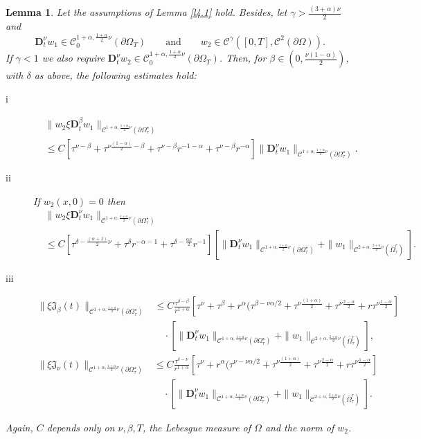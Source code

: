 \documentclass[10pt,a4paper]{amsart}
\newtheorem{lemma}{Lemma}
\def\C {\mathcal{C}}
\begin{document}
\begin{lemma}\label{l4.1bis}
Let the assumptions of Lemma \ref{l4.1} hold. Besides,
let $\gamma>\frac{(3+\alpha)\nu}{2}$ and
\[
\mathbf{D}_{t}^{\nu}w_1\in\C_{0}^{1+\alpha,\frac{1+\alpha}{2}\nu}(\partial\Omega_{T}) \qquad
\text{and}\qquad w_{2}\in\C^{\gamma}([0,T],\C^{2}(\partial\Omega)).
\]
If $\gamma<1$ we
 also require $\mathbf{D}_{t}^{\nu}w_2\in\C_{0}^{1+\alpha,\frac{1+\alpha}{2}\nu}(\partial\Omega_{T})$.
 Then, for $\beta\in(0,\frac{\nu(1-\alpha)}{2})$, with $\delta$ as above,
 the following estimates hold:
 \begin{description}
	\item[i]
	\begin{align*}
	&\|w_2\xi \mathbf{D}_{t}^{\beta}w_1\|_{\C^{1+\alpha,\frac{1+\alpha}{2}\nu}(\partial\Omega^{\star}_{\tau})}\\&\leq C
		[\tau^{\nu-\beta}+\tau^{\nu\frac{(1-\alpha)}{2}-\beta}+\tau^{\nu-\beta}r^{-1-\alpha}+\tau^{\nu-\beta}r^{-\alpha}]\|\mathbf{D}_{t}^{\nu}w_1\|_{\C^{1+\alpha,\frac{1+\alpha}{2}\nu}(\partial\Omega^{\star}_{\tau})}.
	\end{align*}
		\item[ii] If $w_2(x,0)=0$ then
		\begin{align*}
		&\|w_2\xi \mathbf{D}_{t}^{\nu}w_1\|_{\C^{1+\alpha,\frac{1+\alpha}{2}\nu}(\partial\Omega^{\star}_{\tau})}\\&
		\leq C
		[\tau^{\delta-\frac{(\alpha+1)}{2}\nu}+\tau^{\delta}r^{-\alpha-1}+\tau^{\delta-\frac{\alpha\nu}{2}}r^{-1}][\|\mathbf{D}_{t}^{\nu}w_1\|_{\C^{1+\alpha,\frac{1+\alpha}{2}\nu}(\partial\Omega^{\star}_{\tau})}+\|w_1\|_{\C^{2+\alpha,\frac{2+\alpha}{2}\nu}(\bar{\Omega}^{r}_{\tau})}].
		\end{align*}
		\item[iii]
		\begin{align*}
		\|\xi\mathfrak{J}_{\beta}(t)\|_{\C^{1+\alpha,\frac{1+\alpha}{2}\nu}(\partial\Omega^{\star}_{\tau})}&\leq C
		\frac{\tau^{\delta-\beta}}{r^{1+\alpha}}[\tau^{\nu}+\tau^{\beta}+r^{\alpha}(\tau^{\beta-\nu\alpha/2}+\tau^{\nu\frac{(1+\alpha)}{2}}+\tau^{\nu\frac{2-\alpha}{2}}+r\tau^{\nu\frac{1-\alpha}{2}}]\\
		&
		\quad\cdot
		[\|\mathbf{D}_{t}^{\nu}w_1\|_{\C^{1+\alpha,\frac{1+\alpha}{2}\nu}(\partial\Omega^{\star}_{\tau})}+\|w_1\|_{\C^{2+\alpha,\frac{2+\alpha}{2}\nu}(\bar{\Omega}^{r}_{\tau})}],
		\end{align*}
				\begin{align*}
		\|\xi\mathfrak{J}_{\nu}(t)\|_{\C^{1+\alpha,\frac{1+\alpha}{2}\nu}(\partial\Omega^{\star}_{\tau})}&\leq C
		\frac{\tau^{\delta-\nu}}{r^{1+\alpha}}[\tau^{\nu}+r^{\alpha}(\tau^{\nu-\nu\alpha/2}+\tau^{\nu\frac{(1+\alpha)}{2}}+\tau^{\nu\frac{2-\alpha}{2}}+r\tau^{\nu\frac{1-\alpha}{2}}]\\
		&
		\quad\cdot
		[\|\mathbf{D}_{t}^{\nu}w_1\|_{\C^{1+\alpha,\frac{1+\alpha}{2}\nu}(\partial\Omega^{\star}_{\tau})}+\|w_1\|_{\C^{2+\alpha,\frac{2+\alpha}{2}\nu}(\bar{\Omega}^{r}_{\tau})}].
		\end{align*}
		\end{description}
Again, $C$ depends only on $\nu,\beta,T$, the Lebesgue measure of $\Omega$ and the norm of $w_2$.
\end{lemma}
\end{document}

